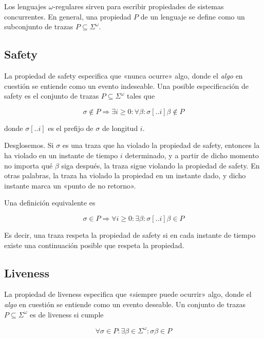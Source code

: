 \documentclass[a4paper, 12pt]{article}
\begin{document}
Los lenguajes $\omega$-regulares sirven para escribir propiedades de sistemas
concurrentes. En general, una propiedad $P$ de un lenguaje se define como un
subconjunto de trazas $P \subseteq \Sigma^\omega$.

\subsection*{Safety}

La propiedad de safety especifica que «nunca ocurre» algo, donde el
\textit{algo} en cuestión se entiende como un evento indeseable. Una posible
especificación de safety es el conjunto de trazas $P \subseteq \Sigma^\omega$ tales que

\begin{equation}
    \sigma \not\in P \Rightarrow \exists  i \geq 0 : \forall \beta :
    \sigma[..i]\beta \not\in P
\end{equation}

donde $\sigma[..i]$ es el prefijo de $\sigma$ de longitud $i$.

Desglosemos. Si $\sigma$ es una traza que ha violado la propiedad de safety,
entonces la ha violado en un instante de tiempo $i$ determinado, y a partir de
dicho momento no importa qué $\beta$ siga después, la traza sigue violando la 
propiedad de safety. En otras palabras, la traza ha violado la propiedad en un
instante dado, y dicho instante marca un «punto de no retorno».

Una definición equivalente es 

\begin{equation}
    \sigma \in P \Rightarrow\forall  i \geq 0: \exists  \beta : \sigma[..i]\beta
    \in P
\end{equation}

Es decir, una traza respeta la propiedad de safety si en cada instante de tiempo
existe una continuación posible que respeta la propiedad.

\subsection*{Liveness}

La propiedad de liveness especifica que «siempre puede ocurrir» algo, donde el
\textit{algo} en cuestión se entiende como un evento deseable. Un conjunto de
trazas $P \subseteq \Sigma^\omega$ es de liveness si cumple 

\begin{equation}
    \forall  \sigma \in P: \exists \beta \in \Sigma^\omega : \sigma\beta \in P
\end{equation}
\end{document}
